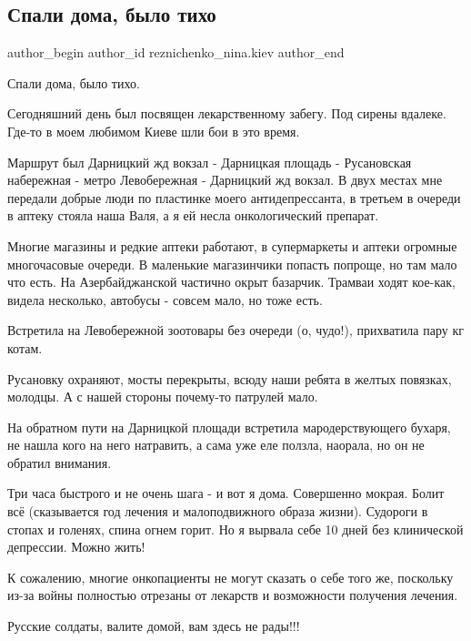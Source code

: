  
 
 
 
 
 
\subsection{Спали дома, было тихо}
\label{sec:28_02_2022.fb.reznichenko_nina.kiev.1.spali_doma}
 
\ifcmt
 author_begin
   author_id reznichenko_nina.kiev
 author_end
\fi

Спали дома, было тихо.

Сегодняшний день был посвящен лекарственному забегу. Под сирены вдалеке. Где-то
в моем любимом Киеве шли бои в это время.


Маршрут был Дарницкий жд вокзал - Дарницкая площадь - Русановская набережная -
метро Левобережная - Дарницкий жд вокзал. В двух местах мне передали добрые
люди по пластинке моего антидепрессанта, в третьем в очереди в аптеку стояла
наша Валя, а я ей несла онкологический препарат. 


Многие магазины и редкие аптеки работают, в супермаркеты и аптеки огромные
многочасовые очереди. В маленькие магазинчики попасть попроще, но там мало что
есть. На Азербайджанской частично окрыт базарчик. Трамваи ходят кое-как, видела
несколько, автобусы - совсем мало, но тоже есть.

Встретила на Левобережной зоотовары без очереди (о, чудо!), прихватила пару кг
котам. 

Русановку охраняют, мосты перекрыты, всюду наши ребята в желтых повязках,
молодцы. А с нашей стороны почему-то патрулей мало. 

На обратном пути на Дарницкой площади встретила мародерствующего бухаря, не
нашла кого на него натравить, а сама уже еле ползла, наорала, но он не обратил
внимания.

Три часа быстрого и не очень шага - и вот я дома. Совершенно мокрая. Болит всё
(сказывается год лечения и малоподвижного образа жизни). Судороги в стопах и
голенях, спина огнем горит. Но я вырвала себе 10 дней без клинической
депрессии. Можно жить!

К сожалению, многие онкопациенты не могут сказать о себе того же, поскольку
из-за войны полностью отрезаны от лекарств и возможности получения лечения.

Русские солдаты, валите домой, вам здесь не рады!!!

